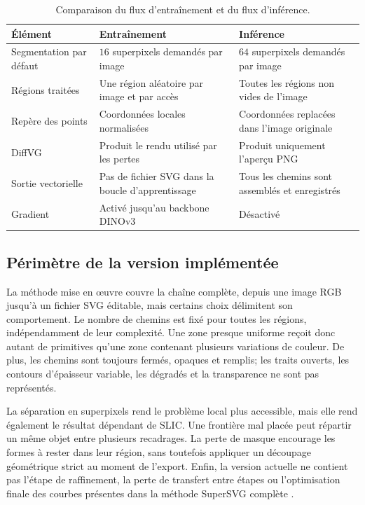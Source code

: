 \documentclass[12pt, a4paper, oneside]{report}
\begin{document}
\begin{table}[H]
    \centering
    \small
    \caption{Comparaison du flux d'entraînement et du flux d'inférence.}
    \label{tab:entrainement_inference}
    \begin{tabular}{p{3.2cm}p{4.8cm}p{4.8cm}}
        \toprule
        \textbf{Élément} & \textbf{Entraînement} & \textbf{Inférence} \\
        \midrule
        Segmentation par défaut & $16$ superpixels demandés par image & $64$ superpixels demandés par image \\
        Régions traitées & Une région aléatoire par image et par accès & Toutes les régions non vides de l'image \\
        Repère des points & Coordonnées locales normalisées & Coordonnées replacées dans l'image originale \\
        DiffVG & Produit le rendu utilisé par les pertes & Produit uniquement l'aperçu PNG \\
        Sortie vectorielle & Pas de fichier SVG dans la boucle d'apprentissage & Tous les chemins sont assemblés et enregistrés \\
        Gradient & Activé jusqu'au backbone DINOv3 & Désactivé \\
        \bottomrule
    \end{tabular}
\end{table}

\subsection{Périmètre de la version implémentée}

La méthode mise en œuvre couvre la chaîne complète, depuis une image RGB jusqu'à un fichier SVG éditable, mais certains choix délimitent son comportement. Le nombre de chemins est fixé pour toutes les régions, indépendamment de leur complexité. Une zone presque uniforme reçoit donc autant de primitives qu'une zone contenant plusieurs variations de couleur. De plus, les chemins sont toujours fermés, opaques et remplis; les traits ouverts, les contours d'épaisseur variable, les dégradés et la transparence ne sont pas représentés.

La séparation en superpixels rend le problème local plus accessible, mais elle rend également le résultat dépendant de SLIC. Une frontière mal placée peut répartir un même objet entre plusieurs recadrages. La perte de masque encourage les formes à rester dans leur région, sans toutefois appliquer un découpage géométrique strict au moment de l'export. Enfin, la version actuelle ne contient pas l'étape de raffinement, la perte de transfert entre étapes ou l'optimisation finale des courbes présentes dans la méthode SuperSVG complète \cite{hu2024supersvg}.
\end{document}
